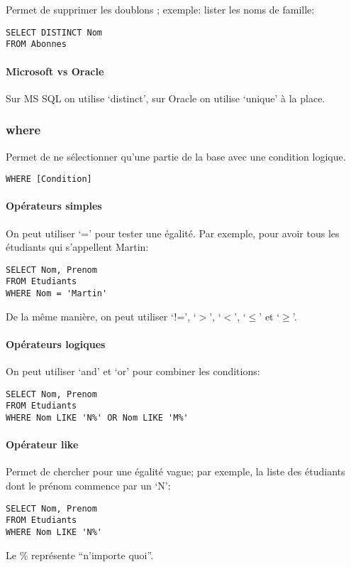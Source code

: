 \documentclass[10pt,a4paper,french]{article}
\begin{document}
Permet de supprimer les doublons ; exemple: lister les noms de famille:
\begin{verbatim}
SELECT DISTINCT Nom
FROM Abonnes
\end{verbatim}

\paragraph{Microsoft vs Oracle}
Sur MS SQL on utilise `\gls{distinct}', sur Oracle on utilise `\gls{unique}' à la place.

\subsubsection{\gls{where}}\label{where}

Permet de ne sélectionner qu'une partie de la base avec une condition logique.
\begin{verbatim}
WHERE [Condition]
\end{verbatim}

\paragraph{Opérateurs simples}
On peut utiliser `=' pour tester une égalité. Par exemple, pour avoir tous les étudiants qui s'appellent Martin:
\begin{verbatim}
SELECT Nom, Prenom
FROM Etudiants
WHERE Nom = 'Martin'
\end{verbatim}
De la même manière, on peut utiliser `!=', `$>$', `$<$', `$\leq$' et `$\geq$'.

\paragraph{Opérateurs logiques}
On peut utiliser `\gls{and}' et `\gls{or}' pour combiner les conditions:
\begin{verbatim}
SELECT Nom, Prenom
FROM Etudiants
WHERE Nom LIKE 'N%' OR Nom LIKE 'M%'
\end{verbatim}

\paragraph{Opérateur \gls{like}}
Permet de chercher pour une égalité vague; par exemple, la liste des étudiants dont le prénom commence par un `N':
\begin{verbatim}
SELECT Nom, Prenom
FROM Etudiants
WHERE Nom LIKE 'N%'
\end{verbatim}
Le \% représente ``n'importe quoi''.
\end{document}
